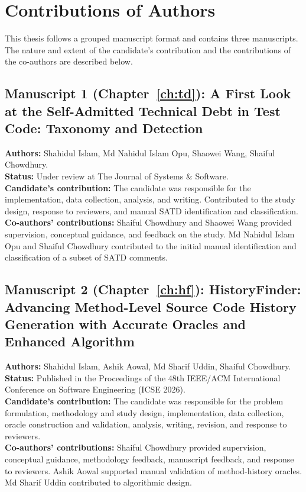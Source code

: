 \chapter*{Contributions of Authors}

This thesis follows a grouped manuscript format and contains three manuscripts. The nature and extent of the candidate's contribution and the contributions of the co-authors are described below.


\section*{Manuscript 1 (Chapter~\ref{ch:td}): A First Look at the Self-Admitted Technical Debt in Test Code: Taxonomy and Detection}
\textbf{Authors:} Shahidul Islam, Md Nahidul Islam Opu, Shaowei Wang, Shaiful Chowdhury.\\
\textbf{Status:} Under review at The Journal of Systems \& Software.\\
\textbf{Candidate's contribution:} The candidate was responsible for the implementation, data collection, analysis, and writing. Contributed to the study design, response to reviewers, and manual SATD identification and classification.\\
\textbf{Co-authors' contributions:} Shaiful Chowdhury and Shaowei Wang provided supervision, conceptual guidance, and feedback on the study. Md Nahidul Islam Opu and Shaiful Chowdhury contributed to the initial manual identification and classification of a subset of SATD comments.

\section*{Manuscript 2 (Chapter~\ref{ch:hf}): HistoryFinder: Advancing Method-Level Source Code History Generation with Accurate Oracles and Enhanced Algorithm}
\textbf{Authors:} Shahidul Islam, Ashik Aowal, Md Sharif Uddin, Shaiful Chowdhury.\\
\textbf{Status:} Published in the Proceedings of the 48th IEEE/ACM International Conference on Software Engineering (ICSE 2026).\\
\textbf{Candidate's contribution:} The candidate was responsible for the problem formulation, methodology and study design, implementation, data collection, oracle construction and validation, analysis, writing, revision, and response to reviewers.\\
\textbf{Co-authors' contributions:} Shaiful Chowdhury provided supervision, conceptual guidance, methodology feedback, manuscript feedback, and response to reviewers. Ashik Aowal supported manual validation of method-history oracles. Md Sharif Uddin contributed to algorithmic design.


